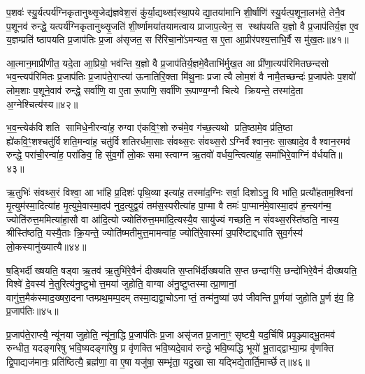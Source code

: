 प॒शवः॑ स्यु॒र्यत्पर्य॑ग्निकृतानुथ्सृ॒जेद्य॑ज्ञवेश॒सं कु॑र्या॒द्यथ्सꣵ॑स्था॒पयेद्या॒तया॑मानि शी॒र्\mbox{}षाणि॑ स्यु॒र्यत्प॒शूना॒लभ॑ते॒ तेनै॒व प॒शूनव॑ रुन्द्धे॒ यत्पर्य॑ग्निकृतानुथ्सृ॒जति॑ शी॒र्ष्णामया॑तयामत्वाय प्राजाप॒त्येन॒ स स्था॑पयति य॒ज्ञो वै प्र॒जाप॑तिर्य॒ज्ञ ए॒व य॒ज्ञम्प्रति॑ ष्ठापयति प्र॒जाप॑तिः प्र॒जा अ॑सृजत॒ स रि॑रिचा॒नो॑ऽमन्यत॒ स ए॒ता आ॒प्रीर॑पश्य॒त्ताभि॒र्वै स मु॑ख॒तः॥४१॥

आ॒त्मान॒माप्री॑णीत॒ यदे॒ता आ॒प्रियो॒ भव॑न्ति य॒ज्ञो वै प्र॒जाप॑तिर्य॒ज्ञमे॒वैताभि॑र्मुख॒त आ प्री॑णा॒त्यप॑रिमितछन्दसो भव॒न्त्यप॑रिमितः प्र॒जाप॑तिः प्र॒जाप॑ते॒राप्त्या॑ ऊनातिरि॒क्ता मि॑थु॒नाः प्रजात्यै लोम॒शं वै नामै॒तच्छन्दः॑ प्र॒जाप॑तेः प॒शवो॑ लोम॒शाः प॒शूने॒वाव॑ रुन्द्धे॒ सर्वा॑णि॒ वा ए॒ता रू॒पाणि॒ सर्वा॑णि रू॒पाण्य॒ग्नौ चित्ये क्रियन्ते॒ तस्मा॑दे॒ता अ॒ग्नेश्चित्य॑स्य॥४२॥

भ॒व॒न्त्येक॑विशति सामिधे॒नीरन्वा॑ह॒ रुग्वा ए॑कवि॒ꣳ॒शो रुच॑मे॒व ग॑च्छ॒त्यथो प्रति॒ष्ठामे॒व प्र॑ति॒ष्ठा ह्ये॑कवि॒ꣳ॒शश्चतु॑र्विशति॒मन्वा॑ह॒ चतु॑र्विशतिरर्धमा॒साः सं॑वथ्स॒रः सं॑वथ्स॒रोऽग्निर्वैश्वान॒रः सा॒ख्षादे॒व वैश्वान॒रमव॑ रुन्द्धे॒ परा॑ची॒रन्वा॑ह॒ परा॑ङिव॒ हि सु॑व॒र्गो लो॒कः समास्त्वाग्न ऋ॒तवो॑ वर्धय॒न्त्वित्या॑ह॒ समा॑भिरे॒वाग्निं व॑र्धयति॥४३॥

ऋ॒तुभिः॑ संवथ्स॒रं विश्वा॒ आ भा॑हि प्र॒दिशः॑ पृथि॒व्या इत्या॑ह॒ तस्मा॑द॒ग्निः सर्वा॒ दिशोऽनु॒ वि भा॑ति॒ प्रत्यौ॑हताम॒श्विना॑ मृ॒त्युम॑स्मा॒दित्या॑ह मृ॒त्युमे॒वास्मा॒दप॑ नुद॒त्युद्व॒यं तम॑स॒स्परीत्या॑ह पा॒प्मा वै तमः॑ पा॒प्मान॑मे॒वास्मा॒दप॑ ह॒न्त्यग॑न्म॒ ज्योति॑रुत्त॒ममित्या॑हा॒सौ वा आ॑दि॒त्यो ज्योति॑रुत्त॒ममा॑दि॒त्यस्यै॒व सायु॑ज्यं गच्छति॒ न सं॑वथ्स॒रस्ति॑ष्ठति॒ नास्य॒ श्रीस्ति॑ष्ठति॒ यस्यै॒ताः क्रि॒यन्ते॒ ज्योति॑ष्मतीमुत्त॒मामन्वा॑ह॒ ज्योति॑रे॒वास्मा॑ उ॒परि॑ष्टाद्दधाति सुव॒र्गस्य॑ लो॒कस्यानु॑ख्यात्यै॥४४॥

{\anuvakamend[{याव॑न्तोऽस्य मुख॒तश्चित्य॑स्य वर्धयत्यादि॒त्योऽष्टाविꣳ॑शतिश्च॥८॥}]}

ष॒ड्भिर्दीख्षयति॒ षड्वा ऋ॒तव॑ ऋ॒तुभि॑रे॒वैनं॑ दीख्षयति स॒प्तभि॑र्दीख्षयति स॒प्त छन्दाꣳ॑सि॒ छन्दो॑भिरे॒वैनं॑ दीख्षयति॒ विश्वे॑ दे॒वस्य॑ ने॒तुरित्य॑नु॒ष्टुभोत्त॒मया॑ जुहोति॒ वाग्वा अ॑नु॒ष्टुप्तस्मात्प्रा॒णानां॒ वागु॑त्त॒मैक॑स्माद॒ख्षरा॒दनाप्तम्प्रथ॒मम्प॒दम् तस्मा॒द्यद्वा॒चोऽनाप्तं॒ तन्म॑नु॒ष्या॑ उप॑ जीवन्ति पू॒र्णया॑ जुहोति पू॒र्ण इ॑व॒ हि प्र॒जाप॑तिः॥४५॥

प्र॒जाप॑ते॒राप्त्यै॒ न्यू॑नया जुहोति॒ न्यू॑ना॒द्धि प्र॒जाप॑तिः प्र॒जा असृ॑जत प्र॒जाना॒ꣳ॒ सृष्ट्यै॒ यद॒र्चिषि॑ प्रवृ॒ञ्ज्याद्भू॒तमव॑ रुन्धीत॒ यदङ्गा॑रेषु भवि॒ष्यदङ्गा॑रेषु॒ प्र वृ॑णक्ति भवि॒ष्यदे॒वाव॑ रुन्द्धे भवि॒ष्यद्धि भूयो॑ भू॒ताद्द्वाभ्या॒म्प्र वृ॑णक्ति द्वि॒पाद्यज॑मानः॒ प्रति॑ष्ठित्यै॒ ब्रह्म॑णा॒ वा ए॒षा यजु॑षा॒ सम्भृ॑ता॒ यदु॒खा सा यद्भिद्ये॒तार्ति॒मार्च्छेत्॥४६॥

